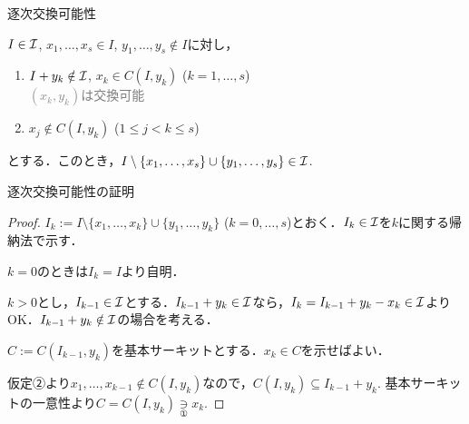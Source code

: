 \documentclass[14pt,aspectratio=169,xcolor=dvipsnames,table,onlytextwidth,dvipdfmx]{beamer}
\begin{document}
\begin{frame}{逐次交換可能性}
    \small
    
    \begin{lemma}[逐次交換補題]
        $I \in \mathcal{I}$, $x_1, \dots, x_s \in I$, $y_1, \dots, y_s \notin I$に対し，
        \begin{enumerate}
            \setlength{\itemsep}{0pt}
            \item $I + y_k \notin \mathcal{I}$, $x_k \in C(I, y_k)$ \quad ($k=1, \dots, s$) \\ 
            \textcolor{gray}{\dotfill $(x_k, y_k)$は交換可能}
            \item $x_j \notin C(I, y_k)$ \quad ($1 \leq j < k \leq s$)
        \end{enumerate}
    とする．このとき，$I \setminus \{x_1, \dots, x_s\} \cup \{y_1, \dots, y_s\} \in \mathcal{I}$.
    \end{lemma}

    \centering
\end{frame}

\begin{frame}{逐次交換可能性の証明}
    \begin{proof}
         $I_k := I \setminus \{x_1, \dots, x_k\} \cup \{y_1, \dots, y_k\}$ ($k=0, \dots, s$)とおく．$I_k \in \mathcal{I}$を$k$に関する帰納法で示す．
    
    \bigskip
    $k=0$のときは$I_k = I$より自明．
    
    $k > 0$とし，$I_{k-1} \in \mathcal{I}$とする．$I_{k-1} + y_k \in \mathcal{I}$なら，$I_k = I_{k-1} + y_k - x_k \in \mathcal{I}$よりOK．$I_{k-1} + y_k \notin \mathcal{I}$の場合を考える．

    \bigskip
    $C := C(I_{k-1}, y_k)$を基本サーキットとする．$x_k \in C$を示せばよい．

    仮定②より$x_1, \dots, x_{k-1} \notin C(I, y_k)$なので，$C(I, y_k) \subseteq I_{k-1} + y_k$. 
    基本サーキットの一意性より$C = C(I, y_k) \underset{\text{①}}{\ni} x_k$.
    \end{proof}
\end{frame}
\end{document}

